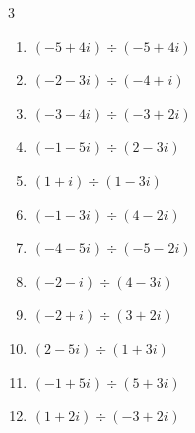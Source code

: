 \begin{multicols}{3}
\begin{enumerate}
  \item $\displaystyle (-5+4i)\div(-5+4i)$

        \phantom{$\displaystyle =1$}

  \item $\displaystyle (-2-3i)\div(-4+i)$


  \item $\displaystyle (-3-4i)\div(-3+2i)$


  \item $\displaystyle (-1-5i)\div(2-3i)$

        \phantom{$\displaystyle =1-i$}

  \item $\displaystyle (1+i)\div(1-3i)$


\columnbreak %

  \item $\displaystyle (-1-3i)\div(4-2i)$


  \item $\displaystyle (-4-5i)\div(-5-2i)$


  \item $\displaystyle (-2-i)\div(4-3i)$


  \item $\displaystyle (-2+i)\div(3+2i)$


  \item $\displaystyle (2-5i)\div(1+3i)$


  \item $\displaystyle (-1+5i)\div(5+3i)$


  \item $\displaystyle (1+2i)\div(-3+2i)$


\end{enumerate}
\end{multicols}

